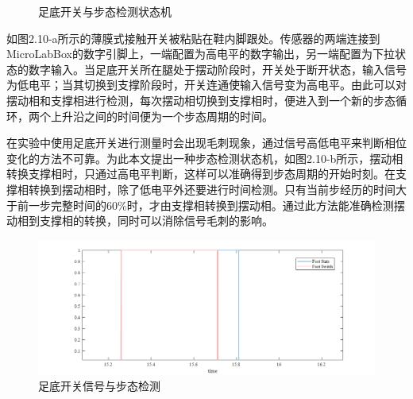 \begin{figure}[!htb]
    \quad
    \caption{足底开关与步态检测状态机}
    \label{fig:subfigss}
\end{figure}

如图2.10-a所示的薄膜式接触开关被粘贴在鞋内脚跟处。传感器的两端连接到MicroLabBox的数字引脚上，一端配置为高电平的数字输出，另一端配置为下拉状态的数字输入。当足底开关所在腿处于摆动阶段时，开关处于断开状态，输入信号为低电平；当其切换到支撑阶段时，开关连通使输入信号变为高电平。由此可以对摆动相和支撑相进行检测，每次摆动相切换到支撑相时，便进入到一个新的步态循环，两个上升沿之间的时间便为一个步态周期的时间。

在实验中使用足底开关进行测量时会出现毛刺现象，通过信号高低电平来判断相位变化的方法不可靠。为此本文提出一种步态检测状态机，如图2.10-b所示，摆动相转换支撑相时，只通过高电平判断，这样可以准确得到步态周期的开始时刻。在支撑相转换到摆动相时，除了低电平外还要进行时间检测。只有当前步经历的时间大于前一步完整时间的60\%时，才由支撑相转换到摆动相。通过此方法能准确检测摆动相到支撑相的转换，同时可以消除信号毛刺的影响。

\begin{figure}[htb]
    \includegraphics[width=16cm]{fig/f33.png}
    \caption{足底开关信号与步态检测}
    \label{fig:mark}
\end{figure}


